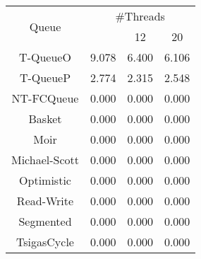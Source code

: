 \begin{tabular}{|c|c|c|c|}
\hline
\multirow{2}{*}{Queue} & \multicolumn{3}{c|}{\#Threads}\\\cline{2-4}& \quad 4 & 12 & 20\\
\hline
\hline
T-QueueO & 9.078 & 6.400 & 6.106\\
T-QueueP & 2.774 & 2.315 & 2.548\\
NT-FCQueue & 0.000 & 0.000 & 0.000\\
Basket & 0.000 & 0.000 & 0.000\\
Moir & 0.000 & 0.000 & 0.000\\
Michael-Scott & 0.000 & 0.000 & 0.000\\
Optimistic & 0.000 & 0.000 & 0.000\\
Read-Write & 0.000 & 0.000 & 0.000\\
Segmented & 0.000 & 0.000 & 0.000\\
TsigasCycle & 0.000 & 0.000 & 0.000\\
\hline\end{tabular}
